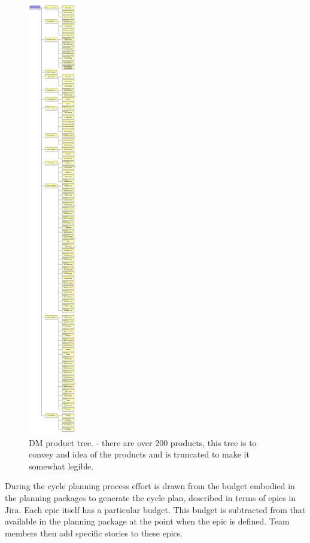 \begin{figure}[htbp]
        \begin{center}
                 \includegraphics[height=19cm]{ProductTree}
                 \caption{DM product tree. \label{fig:prods}- there are over 200 products, this tree is to convey and idea of the products and is truncated to make it somewhat legible.
         }

         \end{center}
 \end{figure}

During the cycle planning process  effort is drawn from the budget embodied in the planning packages to generate the cycle plan, described in terms of epics in Jira.
Each epic itself has a particular budget.
This budget is subtracted from that available in the planning package at the point when the epic is defined.
Team members then add specific stories to these epics.

